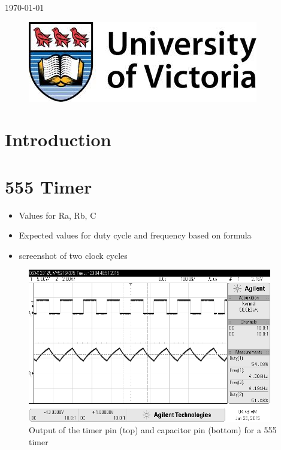 \documentclass[11pt]{article}
\begin{document}
\begin{titlepage}
{\large \today}\\ %

\begin{figure}[b]	 %
	\centering
	\includegraphics[scale=0.3]{UVic_logo}
\end{figure}

\end{titlepage}


\section{Introduction}

\section{555 Timer}
\begin{itemize}
	\item Values for Ra, Rb, C
	\item Expected values for duty cycle and frequency based on formula
	\item screenshot of two clock cycles
\end{itemize}

\begin{figure}[htpb]
	\centering
	\includegraphics[width=0.95\textwidth]{timer}
	\caption{Output of the timer pin (top) and capacitor pin (bottom) for a 555 timer}
	\label{fig:timer}
\end{figure}
\end{document}
